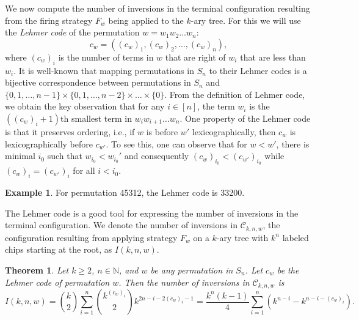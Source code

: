 \documentclass[final]{dmtcs-episciences}
\newtheorem{theorem}{Theorem}[section]
\theoremstyle{definition}
\newtheorem{example}{Example}
\theoremstyle{remark}
\begin{document}
We now compute the number of inversions in the terminal configuration resulting from the firing strategy $F_w$ being applied to the $k$-ary tree. For this we will use the \textit{Lehmer code} of the permutation $w=w_1w_2\dots w_n$: $$c_w = ((c_{w})_1, (c_{w})_2, \dots, (c_{w})_n),$$
where $(c_{w})_i$ is the number of terms in $w$ that are right of $w_i$ that are less than $w_i$. It is well-known that mapping permutations in $S_n$ to their Lehmer codes is a bijective correspondence between permutations in $S_n$ and $\{0, 1, \dots, n-1\}\times \{0, 1, \dots, n-2\} \times \dots \times \{0\}$. From the definition of Lehmer code, we obtain the key observation that for any $i \in [n]$, the term $w_i$ is the $((c_w)_i+1)$th smallest term in $w_iw_{i+1}\dots w_n$. One property of the Lehmer code is that it preserves ordering, i.e., if $w$ is before $w'$ lexicographically, then $c_w$ is lexicographically before $c_{w'}$. To see this, one can observe that for $w < w'$, there is minimal $i_0$ such that $w_{i_0} < w_{i_{0}}'$ and consequently $(c_{w})_{i_0} < (c_{w'})_{i_0}$ while $(c_w)_{i} = (c_{w'})_{i}$ for all $i < i_0$.

\begin{example}\label{ex:LehmerCode}
For permutation 45312, the Lehmer code is 33200.
\end{example}

The Lehmer code is a good tool for expressing the number of inversions in the terminal configuration. We denote the number of inversions in $\mathcal{C}_{k, n, w}$, the configuration resulting from applying strategy $F_w$ on a $k$-ary tree with $k^n$ labeled chips starting at the root, as $I(k, n, w)$.

\begin{theorem}\label{thm:Lehmer}
Let $k \geq 2$, $n \in \mathbb{N}$, and $w$ be any permutation in $S_n$. Let $c_w$ be the Lehmer code of permutation $w$. Then the number of inversions in $\mathcal{C}_{k, n, w}$ is
\[I(k, n, w) = \binom{k}{2} \sum_{i=1}^{n}\binom{k^{(c_w)_{i}}}{2}k^{2n-i-2(c_w)_i-1} = \frac{k^n(k-1)}{4}\sum_{i=1}^n(k^{n-i} -k^{n-i-(c_w)_i}).\]
\end{theorem}
\end{document}
